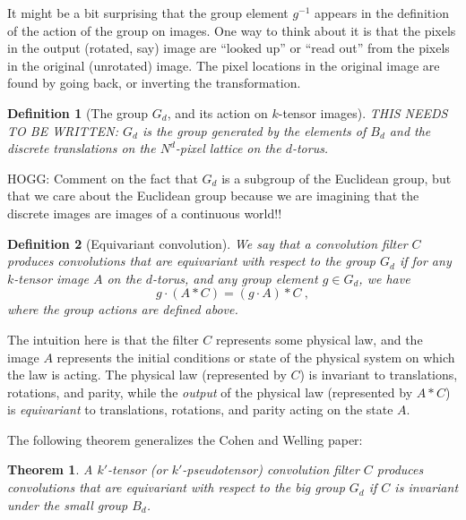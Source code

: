 \documentclass{article}
\theoremstyle{plain}
\newtheorem{definition}{Definition}
\newtheorem{theorem}{Theorem}
\begin{document}
It might be a bit surprising that the group element $g^{-1}$ appears in the definition of the action of the group on images.
One way to think about it is that the pixels in the output (rotated, say) image are ``looked up'' or ``read out'' from the pixels in the original (unrotated) image.
The pixel locations in the original image are found by going back, or inverting the transformation.

\begin{definition}[The group $G_d$, and its action on $k$-tensor images]
THIS NEEDS TO BE WRITTEN: $G_d$ is the group generated by the elements of $B_d$ and the discrete translations on the $N^d$-pixel lattice on the $d$-torus.
\end{definition}

HOGG: Comment on the fact that $G_d$ is a subgroup of the Euclidean group, but that we care about the Euclidean group because we are imagining that the discrete images are images of a continuous world!!

\begin{definition}[Equivariant convolution]
We say that a convolution filter $C$ produces convolutions that are equivariant with respect to the group $G_d$ if for any $k$-tensor image $A$ on the $d$-torus, and any group element $g\in G_d$, we have
\begin{equation}
    g\cdot (A\ast C) = (g\cdot A)\ast C ~,
\end{equation}
where the group actions are defined above.
\end{definition}

The intuition here is that the filter $C$ represents some physical law, and the image $A$ represents the initial conditions or state of the physical system on which the law is acting.
The physical law (represented by $C$) is invariant to translations, rotations, and parity, while the \emph{output} of the physical law (represented by $A\ast C$) is \emph{equivariant} to translations, rotations, and parity acting on the state $A$.

The following theorem generalizes the Cohen and Welling paper:

\begin{theorem}
A $k'$-tensor (or $k'$-pseudotensor) convolution filter $C$ produces convolutions that are equivariant with respect to the big group $G_d$ if $C$ is invariant under the small group $B_d$.
\end{theorem}
\end{document}
